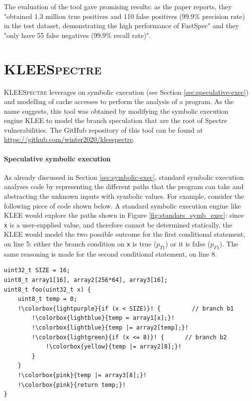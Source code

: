 \documentclass[12pt,a4paper]{book}
\theoremstyle{definition}
\begin{document}
	The evaluation of the tool gave promising results: as the paper reports, they "obtained 1.3 million true positives and 110 false positives (99.9\% precision rate) in the test dataset, demonstrating the high performance of FastSpec" and they "only have 55 false negatives (99.9\% recall rate)".
	
	\section{\textsc{KLEESpectre}}\label{sec:kleespectre}
	\textsc{KLEESpectre} \cite{Wang2019} leverages on symbolic execution (see Section \ref{sec:speculative-exec}) and modelling of cache accesses to perform the analysis of a program. As the name suggests, this tool was obtained by modifying the symbolic execution engine KLEE \cite{Cadar2008} to model the branch speculation that are the root of Spectre vulnerabilities. The GitHub repository of this tool can be found at \url{https://github.com/winter2020/kleespectre}.
	\paragraph{Speculative symbolic execution} As already discussed in Section \ref{sec:symbolic-exec}, standard symbolic execution analyses code by representing the different paths that the program can take and abstracting the unknown inputs with symbolic values. For example, consider the following piece of code shown below. A standard symbolic execution engine like KLEE would explore the paths shown in Figure \ref{fig:standars_symb_exec}: since \texttt{x} is a user-supplied value, and therefore cannot be determined statically, the KLEE would model the two possible outcome for the first conditional statement, on line 5: either the branch condition on \texttt{x} is true ($p_{T1}$) or it is false ($p_{F1}$). The same reasoning is made for the second conditional statement, on line 8.
	\begin{lstlisting}[escapechar=!]
uint32_t SIZE = 16; 
uint8_t array1[16], array2[256*64], array3[16];
uint8_t foo(uint32_t x) { 
	uint8_t temp = 0; 
	!\colorbox{lightpurple}{if (x < SIZE)}! {		  // branch b1
		!\colorbox{lightblue}{temp = array1[x];}!
		!\colorbox{lightblue}{temp |= array2[temp];}!
		!\colorbox{lightgreen}{if (x <= 8)}! {		// branch b2
			!\colorbox{yellow}{temp |= array2[8];}!
		}	
	}
	!\colorbox{pink}{temp |= array3[8];}!
	!\colorbox{pink}{return temp;}!
}
	\end{lstlisting}
\end{document}
